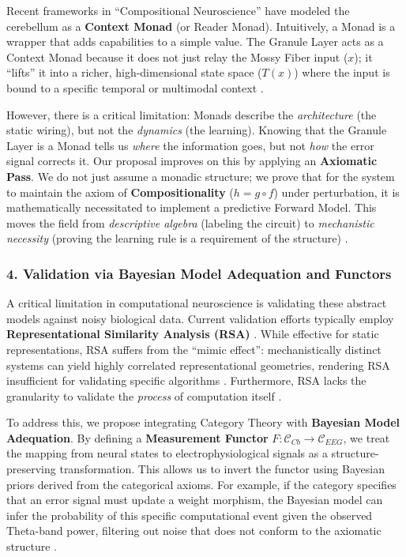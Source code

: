 \documentclass{article}
\begin{document}
	Recent frameworks in ``Compositional Neuroscience'' have modeled the cerebellum as a \textbf{Context Monad} (or Reader Monad). Intuitively, a Monad is a wrapper that adds capabilities to a simple value. The Granule Layer acts as a Context Monad because it does not just relay the Mossy Fiber input ($x$); it ``lifts'' it into a richer, high-dimensional state space ($T(x)$) where the input is bound to a specific temporal or multimodal context \parencite{ghoshCompositionalArchitectureImplicit2025}.
	
	However, there is a critical limitation: Monads describe the \textit{architecture} (the static wiring), but not the \textit{dynamics} (the learning). Knowing that the Granule Layer is a Monad tells us \textit{where} the information goes, but not \textit{how} the error signal corrects it. Our proposal improves on this by applying an \textbf{Axiomatic Pass}. We do not just assume a monadic structure; we prove that for the system to maintain the axiom of \textbf{Compositionality} ($h = g \circ f$) under perturbation, it is mathematically necessitated to implement a predictive Forward Model. This moves the field from \textit{descriptive algebra} (labeling the circuit) to \textit{mechanistic necessity} (proving the learning rule is a requirement of the structure) \parencite{tamimCategoricalInvariantsLearning2025}.
	
	\subsubsection*{4. Validation via Bayesian Model Adequation and Functors}
	A critical limitation in computational neuroscience is validating these abstract models against noisy biological data. Current validation efforts typically employ \textbf{Representational Similarity Analysis (RSA)} \parencite{kriegeskorteRepresentationalSimilarityAnalysis2008}. While effective for static representations, RSA suffers from the ``mimic effect'': mechanistically distinct systems can yield highly correlated representational geometries, rendering RSA insufficient for validating specific algorithms \parencite{dujmovicObstaclesInferringMechanistic2022}. Furthermore, RSA lacks the granularity to validate the \textit{process} of computation itself \parencite{kriegeskorteInferringBraincomputationalMechanisms2016}.
	
	To address this, we propose integrating Category Theory with \textbf{Bayesian Model Adequation}. By defining a \textbf{Measurement Functor} $F: \mathcal{C}_{Cb} \to \mathcal{C}_{EEG}$, we treat the mapping from neural states to electrophysiological signals as a structure-preserving transformation. This allows us to invert the functor using Bayesian priors derived from the categorical axioms. For example, if the category specifies that an error signal must update a weight morphism, the Bayesian model can infer the probability of this specific computational event given the observed Theta-band power, filtering out noise that does not conform to the axiomatic structure \parencite{gavranovicLearningFunctorsUsing2020}.
	
\end{document}
